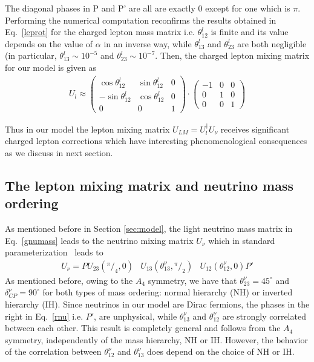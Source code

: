 \documentclass[english,10pt,aps,prd,a4paper,preprintnumbers,floatfix,nofootinbib,showpacs,superscriptaddress]{revtex4-1}
\newcommand*\rfrac[2]{{}^{#1}\!/_{#2}}
\begin{document}
The diagonal phases in P and P' are all are exactly $0$ except for one
which is $\pi$. Performing the numerical computation reconfirms the
results obtained in Eq.~\ref{leprot} for the charged lepton mass
matrix i.e. $\theta^l_{12}$ is finite and its value depends on the
value of $\alpha$ in an inverse way, while $\theta^l_{13}$ and
$\theta^l_{23}$ are both negligible (in particular,
$\theta^l_{13} \sim 10^{-5}$ and $\theta^l_{23} \sim 10^{-7}$.  Then,
the charged lepton mixing matrix for our model is given as
% 
\begin{eqnarray}
U_l \approx \left(\begin{matrix}
\cos \theta^l_{12} & \sin {\theta^l_{12}} & 0 \\
-\sin {\theta^l_{12}} & \cos \theta^l_{12} & 0 \\
0 & 0 & 1
\end{matrix} \right) \cdot 
\left(\begin{matrix}
-1 & 0 & 0 \\
0 & 1 & 0 \\
0 & 0 & 1
\end{matrix} \right) 
\end{eqnarray}

Thus in our model the lepton mixing matrix
$U_{LM} = U^\dagger_l U_\nu$ receives significant charged lepton
corrections which have interesting phenomenological consequences as we
discuss in next section.


\subsection{The lepton mixing matrix and  neutrino mass ordering}
\label{lm}


As mentioned before in Section \ref{sec:model}, the light neutrino
mass matrix in Eq.~\ref{gnumass} leads to the neutrino mixing matrix
$U_\nu$ which in standard parameterization~\cite{Schechter:1980gr}
leads to
%
\begin{eqnarray}
U_\nu  =  P U_{23}\left(\rfrac{\pi}{4}, 0\right)& U_{13}\left( \theta_{13}^\nu, \rfrac{\pi}{2}\right)& U_{12} \left( \theta_{12}^\nu, 0\right) P'
\label{rnu}
\end{eqnarray}
%
As mentioned before, owing to the $A_4$ symmetry, we have that
$\theta_{23}^\nu = 45^{\circ}$ and $\delta^\nu_{CP} = 90^{\circ}$ for
both types of mass ordering: normal hierarchy (NH) or inverted
hierarchy (IH).  
%
Since neutrinos in our model are Dirac fermions, the phases in the
right in Eq.~\ref{rnu} i.e.  $P'$, are unphysical, while
$\theta_{13}^\nu$ and $\theta_{12}^\nu$ are strongly correlated
between each other. 
%
This result is completely general and follows from the $A_4$ symmetry,
independently of the mass hierarchy, NH or IH. However, the behavior
of the correlation between $\theta_{12}^\nu$ and $\theta_{13}^\nu$
does depend on the choice of NH or IH.
\end{document}
